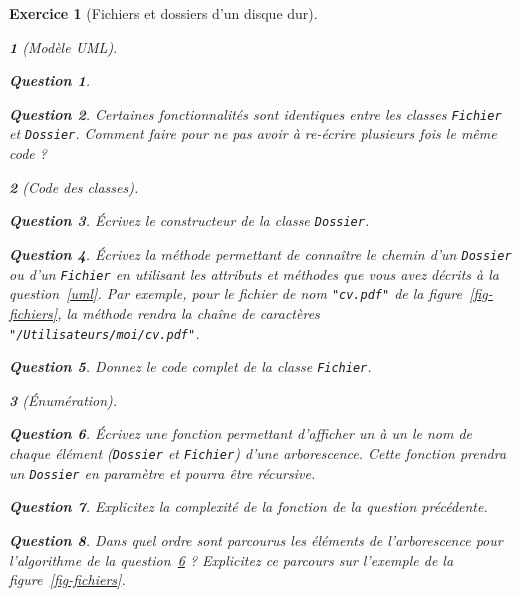\documentclass{article}
\theoremstyle{exostyle}
\newtheorem{exo}{Exercice}
\theoremstyle{partiestyle}
\newtheorem{partie}{}[exo]
\theoremstyle{questionstyle}
\newtheorem{questionpartie}{Question}[partie]
\begin{document}
\begin{exo}[Fichiers et dossiers d'un disque dur]
\begin{partie}[Modèle UML]
\begin{questionpartie}
\end{questionpartie}

\begin{questionpartie}
Certaines fonctionnalités sont identiques entre les classes \verb`Fichier` et \verb`Dossier`. Comment faire pour ne pas avoir à re-écrire plusieurs fois le même code ?\end{questionpartie}

\end{partie}
\begin{partie}[Code des classes]
\begin{questionpartie}
Écrivez le constructeur de la classe \verb`Dossier`.
\end{questionpartie}
\begin{questionpartie}
Écrivez la méthode permettant de connaître le chemin d'un \verb`Dossier` ou d'un \verb`Fichier` en utilisant les attributs et méthodes que vous avez décrits à la question~\ref{uml}. Par exemple, pour le fichier de nom \verb`"cv.pdf"` de la figure~\ref{fig-fichiers}, la méthode rendra la chaîne de caractères \verb`"/Utilisateurs/moi/cv.pdf"`.
\end{questionpartie}
\begin{questionpartie}
Donnez le code complet de la classe \verb`Fichier`. 
\end{questionpartie}

\end{partie}
\begin{partie}[Énumération]
\begin{questionpartie}
\label{algo-parcours}
Écrivez une fonction permettant d'afficher un à un le nom de chaque élément (\verb`Dossier` et \verb`Fichier`) d'une arborescence. Cette fonction prendra un \verb`Dossier` en paramètre et pourra être récursive.
\end{questionpartie}
\begin{questionpartie}
Explicitez la complexité de la fonction de la question précédente.
\end{questionpartie}
\begin{questionpartie}
Dans quel ordre sont parcourus les éléments de l'arborescence pour l'algorithme de la question~\ref{algo-parcours} ? Explicitez ce parcours sur l'exemple de la figure~\ref{fig-fichiers}.
\end{questionpartie}

\end{partie}
\end{exo}
\end{document}
